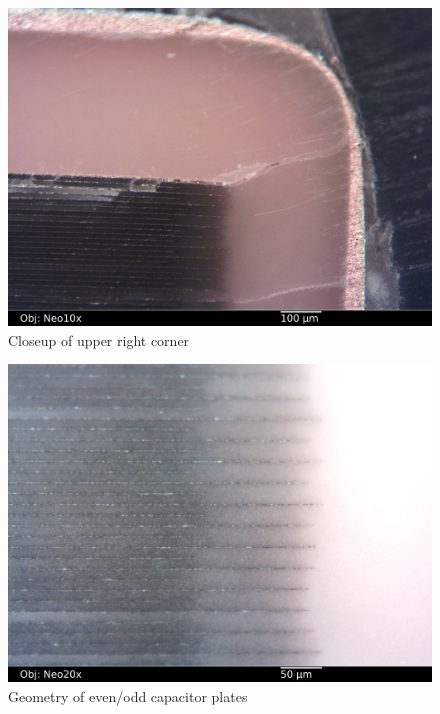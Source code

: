 \documentclass{article}
\begin{document}
\begin{figure}[h]
\includegraphics[width=12cm,keepaspectratio]{section2_03_df_neo10x_annotated.jpg}
\caption{Closeup of upper right corner}
\label{section2_2}
\end{figure}

\begin{figure}[h]
\includegraphics[width=12cm,keepaspectratio]{section2_05_df_neo20x_annotated.jpg}
\caption{Geometry of even/odd capacitor plates}
\label{plate-geometry}
\end{figure}
\end{document}
